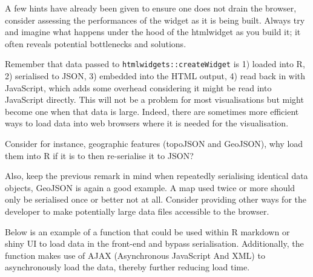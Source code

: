 \documentclass[10pt,]{krantz}
\makeatletter
\newenvironment{Shaded}{\begin{snugshade}}{\end{snugshade}}
\newcommand{\CommentTok}[1]{\textcolor[rgb]{0.37,0.37,0.37}{\textit{#1}}}
\newcommand{\ControlFlowTok}[1]{\textcolor[rgb]{0.27,0.27,0.27}{\textbf{#1}}}
\newcommand{\KeywordTok}[1]{\textcolor[rgb]{0.27,0.27,0.27}{\textbf{#1}}}
\newcommand{\NormalTok}[1]{#1}
\newcommand{\OperatorTok}[1]{\textcolor[rgb]{0.43,0.43,0.43}{\textbf{#1}}}
\newcommand{\StringTok}[1]{\textcolor[rgb]{0.5,0.5,0.5}{#1}}
\newenvironment{kframe}{%
\medskip{}
\setlength{\fboxsep}{.8em}
 \def\at@end@of@kframe{}%
 \ifinner\ifhmode%
  \def\at@end@of@kframe{\end{minipage}}%
  \begin{minipage}{\columnwidth}%
 \fi\fi%
 \def\FrameCommand##1{\hskip\@totalleftmargin \hskip-\fboxsep
 \colorbox{shadecolor}{##1}\hskip-\fboxsep
     \hskip-\linewidth \hskip-\@totalleftmargin \hskip\columnwidth}%
 \MakeFramed {\advance\hsize-\width
   \@totalleftmargin\z@ \linewidth\hsize
   \@setminipage}}%
 {\par\unskip\endMakeFramed%
 \at@end@of@kframe}
\renewenvironment{Shaded}{\begin{kframe}}{\end{kframe}}
\makeatother
\begin{document}
A few hints have already been given to ensure one does not drain the browser, consider assessing the performances of the widget as it is being built. Always try and imagine what happens under the hood of the htmlwidget as you build it; it often reveals potential bottlenecks and solutions.

Remember that data passed to \texttt{htmlwidgets::createWidget} is 1) loaded into R, 2) serialised to JSON, 3) embedded into the HTML output, 4) read back in with JavaScript, which adds some overhead considering it might be read into JavaScript directly. This will not be a problem for most visualisations but might become one when that data is large. Indeed, there are sometimes more efficient ways to load data into web browsers where it is needed for the visualisation.

Consider for instance, geographic features (topoJSON and GeoJSON), why load them into R if it is to then re-serialise it to JSON?

Also, keep the previous remark in mind when repeatedly serialising identical data objects, GeoJSON is again a good example. A map used twice or more should only be serialised once or better not at all. Consider providing other ways for the developer to make potentially large data files accessible to the browser.

Below is an example of a function that could be used within R markdown or shiny UI to load data in the front-end and bypass serialisation. Additionally, the function makes use of AJAX (Asynchronous JavaScript And XML) to asynchronously load the data, thereby further reducing load time.

\begin{Shaded}
\end{Shaded}
\end{document}
